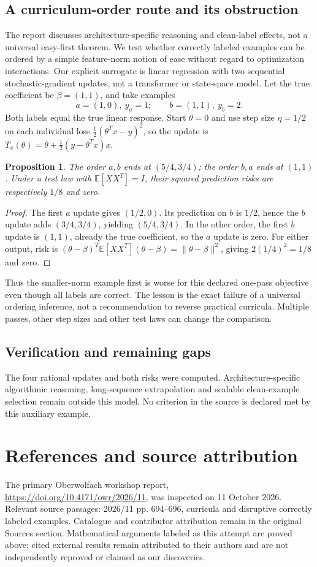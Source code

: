 \documentclass[11pt]{article}
\newtheorem{proposition}{Proposition}
\begin{document}
\subsection{A curriculum-order route and its obstruction}
The report discusses architecture-specific reasoning and clean-label effects, not a universal easy-first theorem. We test whether correctly labeled examples can be ordered by a simple feature-norm notion of ease without regard to optimization interactions. Our explicit surrogate is linear regression with two sequential stochastic-gradient updates, not a transformer or state-space model.
Let the true coefficient be $\beta=(1,1)$, and take examples
\[
 a=(1,0),\ y_a=1;\qquad b=(1,1),\ y_b=2.
\]
Both labels equal the true linear response. Start $\theta=0$ and use step size $\eta=1/2$ on each individual loss $\tfrac12(\theta^Tx-y)^2$, so the update is
$T_x(\theta)=\theta+\tfrac12(y-\theta^Tx)x$.
\begin{proposition}
The order $a,b$ ends at $(5/4,3/4)$; the order $b,a$ ends at $(1,1)$. Under a test law with $\mathbb E[XX^T]=I$, their squared prediction risks are respectively $1/8$ and zero.
\end{proposition}
\begin{proof}
The first $a$ update gives $(1/2,0)$. Its prediction on $b$ is $1/2$, hence the $b$ update adds $(3/4,3/4)$, yielding $(5/4,3/4)$. In the other order, the first $b$ update is $(1,1)$, already the true coefficient, so the $a$ update is zero. For either output, risk is $(\theta-\beta)^T\mathbb E[XX^T](\theta-\beta)=\|\theta-\beta\|^2$, giving $2(1/4)^2=1/8$ and zero.
\end{proof}
Thus the smaller-norm example first is worse for this declared one-pass objective even though all labels are correct. The lesson is the exact failure of a universal ordering inference, not a recommendation to reverse practical curricula. Multiple passes, other step sizes and other test laws can change the comparison.
\subsection{Verification and remaining gaps}
The four rational updates and both risks were computed. Architecture-specific algorithmic reasoning, long-sequence extrapolation and scalable clean-example selection remain outside this model. No criterion in the source is declared met by this auxiliary example.

\section{References and source attribution}
The primary Oberwolfach workshop report, \url{https://doi.org/10.4171/owr/2026/11}, was inspected on 11 October 2026. Relevant source passages: 2026/11 pp. 694--696, curricula and disruptive correctly labeled examples. Catalogue and contributor attribution remain in the original Sources section. Mathematical arguments labeled as this attempt are proved above; cited external results remain attributed to their authors and are not independently reproved or claimed as our discoveries.
\end{document}
